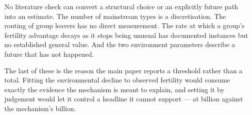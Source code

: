 No literature check can convert a structural choice or an explicitly future path
into an estimate. The number of mainstream types is a discretisation. The routing
of group leavers has no direct measurement. The rate at which a group's fertility
advantage decays as it stops being unusual has documented instances but no
established general value. And the two environment parameters describe a future
that has not happened.

The last of these is the reason the main paper reports a threshold rather than a total. Fitting the
environmental decline to observed fertility would consume exactly the evidence
the mechanism is meant to explain, and setting it by judgement would let it
control a headline it cannot support --- at \LadderPressureLoss{} billion against the mechanism's \LadderMainstreamGain{} billion.
